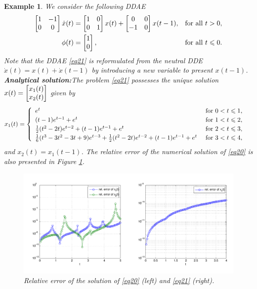 \documentclass[final,reqno]{siamltex}
\newtheorem{example}[theorem]{Example}
\begin{document}
\begin{example}\label{Exa2} We consider the following DDAE
%
\begin{equation}\label{eq21}
\begin{aligned}
\m{
1&-1\\
0&0 
}
\dot{x}(t) &=
\m{
1& 0\\
0&1 
}
x(t) + 
\m{
0& 0\\
-1&0
}
x(t-1), && \mbox{for all } t>0,\\
\phi(t) &=
\m{
1\\
0 
},
&& \mbox{for all } t \leq 0.
\end{aligned}
\end{equation}
%
Note that the DDAE \eqref{eq21} is reformulated from the neutral DDE $\dot{x}(t)=x(t)+\dot{x}(t-1)$ by introducing a new variable to present $x(t-1)$.\\
{\bf Analytical solution:}\quad The problem \eqref{eq21} possesses the unique solution 
$x(t)= \begin{bmatrix} x_1(t) \\ x_2(t) \end{bmatrix}$ given by
\begin{align*}
x_1(t)=
\begin{cases}
\begin{array}{ll}
e^t & \mbox{ for } 0<t\leqslant1, \\
(t-1)e^{t-1}+e^t & \mbox{ for } 1<t\leqslant2, \\
\tfrac12(t^2-2t)e^{t-2}+(t-1)e^{t-1}+e^t & \mbox{ for } 2<t\leqslant3,\\
\tfrac16(t^3-3t^2-3t+9)e^{t-3}+\tfrac12 (t^2-2t)e^{t-2}+(t-1)e^{t-1}+e^t & \mbox{ for } 3<t\leqslant4,
\end{array}
\end{cases}
\end{align*}
and
$x_2(t)=x_1(t-1)$. The relative error of the numerical solution of \eqref{eq20} is also presented in Figure \ref{fig_Paul}.

\begin{figure}[h]
 \centering
 \includegraphics[width=\textwidth]{plot_149_214.pdf}
 \caption{Relative error of the solution of \eqref{eq20} (left) and \eqref{eq21} (right).}
 \label{fig_Paul}
\end{figure}
\end{example}
\end{document}

